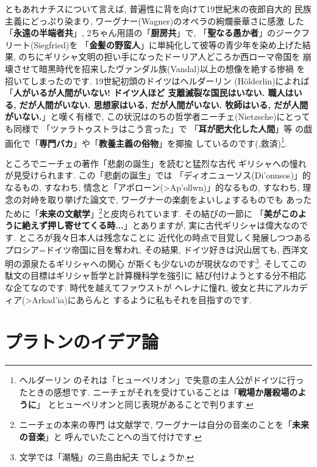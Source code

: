 ともあれナチスについて言えば, 普遍性に背を向けて19世紀末の夜郎自大的
民族主義にどっぷり染まり, ワーグナー(Wagner)のオペラの絢爛豪華さに感激
した「\textbf{永遠の半端者共}」, 2ちゃん用語の「\textbf{厨房共}」で,
 「\textbf{聖なる愚か者}」のジークフリート(Siegfried)を
「\textbf{金髪の野蛮人}」に単純化して彼等の青少年を染め上げた結果,
 のちにギリシャ文明の担い手になったドーリア人どころか西ローマ帝国を
崩壊させて暗黒時代を招来したヴァンダル族(Vandal)以上の想像を絶する惨禍
を招いてしまったのです. 19世紀初頭のドイツはヘルダーリン
(H\"olderlin)によれば「\textbf{人がいるが人間がいない! ドイツ人ほど
支離滅裂な国民はいない. 職人はいる, だが人間がいない. 思想家はいる,
 だが人間がいない. 牧師はいる, だが人間がいない.}」と嘆く有様で,
 この状況はのちの哲学者ニーチェ(Nietzsche)にとっても同様で
「ツァラトゥストラはこう言った」で 「\textbf{耳が肥大化した人間}」等
の戯画化で「\textbf{専門バカ}」や「\textbf{教養主義の俗物}」を揶揄
しているのです(\cite{ツァラトゥストラ},救済)\footnote{ヘルダーリン
のそれは「ヒューペリオン」で失意の主人公がドイツに行ったときの感想です.
 ニーチェがそれを受けていることは「\textbf{戦場か屠殺場のように}」
 とヒューペリオンと同じ表現があることで判ります.}.
\newline

ところでニーチェの著作「悲劇の誕生」\cite{悲劇の誕生}を読むと猛烈な古代
ギリシャへの憧れが見受けられます. この「悲劇の誕生」では
「ディオニューソス(\textgreek{Di'onusos})」的なるもの, すなわち,
情念と「アポローン(\textgreek{>Ap'ollwn})」的なるもの, すなわち,
 理念の対峙を取り挙げた論文で, ワーグナーの楽劇をよいしょするものでも
あったために「\textbf{未来の文献学}」\footnote{ニーチェの本来の専門
は文献学で, ワーグナーは自分の音楽のことを「\textbf{未来の音楽}」と
呼んでいたことへの当て付けです.}と皮肉られています. その結びの一節に
「\textbf{美がこのように絶えず押し寄せてくる時...}」とありますが,
 実に古代ギリシャは偉大なのです. ところが我々日本人は残念なことに
近代化の時点で目覚しく発展しつつあるプロシア=ドイツ帝国に目を奪われ,
 その結果, ドイツ好きは沢山居ても, 西洋文明の源泉たるギリシャへの関心
が斯くも少ないのが現状なのです\footnote{文学では「潮騒」の三島由紀夫
でしょうか.}. そしてこの駄文の目標はギリシャ哲学と計算機科学を強引に
結び付けようとする分不相応な企てなのです. 時代を越えてファウストが
ヘレナに憧れ, 彼女と共にアルカディア(\textgreek{>Arkad'ia})にあらんと
するように私もそれを目指すのです.

\section{プラトンのイデア論}


